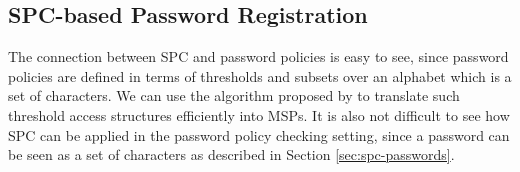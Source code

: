 \subsection{SPC-based Password Registration}\label{sec:protocol}

The connection between \acl{SPC} and password policies is easy to see, since password policies are defined in terms of thresholds and subsets over an alphabet which is a set of characters.
We can use the algorithm proposed by \citet{LiuC10} to translate such threshold access structures efficiently into \acp{MSP}. 
It is also not difficult to see how \ac{SPC} can be applied in the password policy checking setting, since a password can be seen as a set of characters as described in Section \ref{sec:spc-passwords}. 


